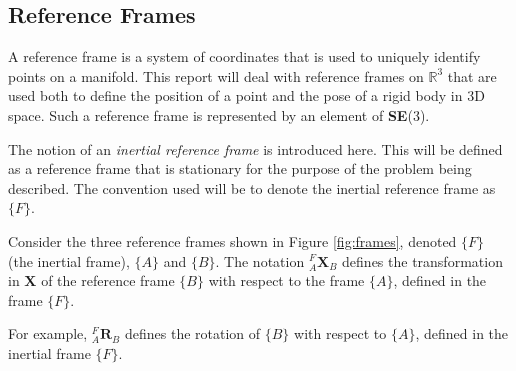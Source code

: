 		\begin{comment}		
		\textbf{Adjoint Map}\\
		EXPLANATION\\
		The adjoint map of $\mathbf{SE}(3)$ is
		\begin{equation}
			\Psi_S: \mathbf{SE}(3) \rightarrow \mathbf{SE}(3) \textnormal{, }
			\Psi_S(A) \stackrel{\Delta}{=} SAS^{-1}
		\end{equation}
		Taking the derivative:
		\begin{equation}
			\frac{\partial}{\partial t} \Psi_S(A(t))|_{t=0} = SBS^{-1} \textnormal{, }
			B \stackrel{\Delta}{=} 	\frac{\partial}{\partial t}A(t)|_{t=0}
		\end{equation}
		The adjoint	representation of $\mathbf{SE}(3)$ is given by the mapping
		\begin{equation}
			\textbf{Adj}_S: \mathfrak{se}(3) \rightarrow \mathfrak{se}(3) \textnormal{, }
			\textbf{Adj}_S(B) \stackrel{\Delta}{=} SBS^{-1}
		\end{equation}
		\end{comment}
		
	\subsection{Reference Frames}
		A reference frame is a system of coordinates that is used to uniquely identify points on a manifold. This report will deal with reference frames on $\mathbb{R}^3$ that are used both to define the position of a point and the pose of a rigid body in 3D space.
		Such a reference frame is represented by an element of \textbf{SE}(3).
		
		The notion of an \textit{inertial reference frame} is introduced here. This will be defined as a reference frame that is stationary for the purpose of the problem being described. The convention used will be to denote the inertial reference frame as $\{F\}$.
		
		Consider the three reference frames shown in Figure \ref{fig:frames}, denoted $\{F\}$ (the inertial frame), $\{A\}$ and $\{B\}$.
		The notation $^{F}_{A}\mathbf{X}^{}_{B}$ defines the transformation in $\mathbf{X}$ of the reference frame $\{B\}$ with respect to the frame $\{A\}$, defined in the frame $\{F\}$.
		
		
		For example, $^{F}_{A}\mathbf{R}^{}_{B}$ defines the rotation of $\{B\}$ with respect to $\{A\}$, defined in the inertial frame $\{F\}$.		
		
